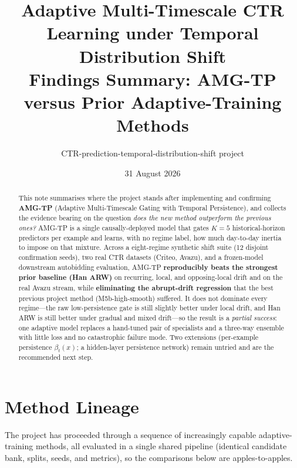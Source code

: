 \documentclass[11pt]{article}
\title{\textbf{Adaptive Multi-Timescale CTR Learning under Temporal Distribution
Shift}\\[4pt]
\large Findings Summary: AMG-TP versus Prior Adaptive-Training Methods}
\author{CTR-prediction-temporal-distribution-shift project}
\date{31 August 2026}
\begin{document}
\maketitle

\begin{abstract}
\noindent
This note summarises where the project stands after implementing and confirming
\textbf{AMG-TP} (Adaptive Multi-Timescale Gating with Temporal Persistence), and
collects the evidence bearing on the question \emph{does the new method
outperform the previous ones?} AMG-TP is a single causally-deployed model that
gates $K{=}5$ historical-horizon predictors per example and learns, with no
regime label, how much day-to-day inertia to impose on that mixture. Across a
eight-regime synthetic shift suite (12 disjoint confirmation seeds), two real
CTR datasets (Criteo, Avazu), and a frozen-model downstream autobidding
evaluation, AMG-TP \textbf{reproducibly beats the strongest prior baseline (Han
ARW)} on recurring, local, and opposing-local drift and on the real Avazu
stream, while \textbf{eliminating the abrupt-drift regression} that the best
previous project method (M5b-high-smooth) suffered. It does not dominate every
regime---the raw low-persistence gate is still slightly better under local
drift, and Han ARW is still better under gradual and mixed drift---so the result
is a \emph{partial success}: one adaptive model replaces a hand-tuned pair of
specialists and a three-way ensemble with little loss and no catastrophic
failure mode. Two extensions (per-example persistence $\beta_t(x)$; a
hidden-layer persistence network) remain untried and are the recommended next
step.
\end{abstract}

\section{Method Lineage}

The project has proceeded through a sequence of increasingly capable
adaptive-training methods, all evaluated in a single shared pipeline (identical
candidate bank, splits, seeds, and metrics), so the comparisons below are
apples-to-apples.
\end{document}
